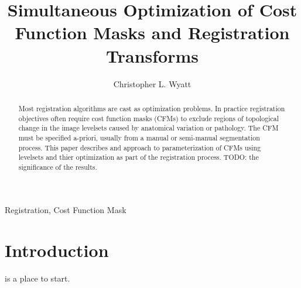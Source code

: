 \documentclass[preprint,review,12pt]{elsarticle}
\begin{document}
\begin{frontmatter}

\title{Simultaneous Optimization of Cost Function Masks and
  Registration Transforms}

\author[CLW]{Christopher L. Wyatt}

\address[CLW]{Bradley Department of Electrical and Computer Engineering, Virginia Tech, Blacksburg, VA, USA}

\begin{abstract}
  Most registration algorithms are cast as optimization problems. In
  practice registration objectives often require cost function masks
  (CFMs) to exclude regions of topological change in the image
  levelsets caused by anatomical variation or pathology. The CFM must
  be specified a-priori, usually from a manual or semi-manual
  segmentation process. This paper describes and approach to
  parameterization of CFMs using levelsets and thier optimization as
  part of the registration process. TODO: the significance of the
  results.
\end{abstract}

\begin{keyword}
Registration, Cost Function Mask
\end{keyword}

\end{frontmatter}

\section{Introduction}
\cite{Crum2003} is a place to start.
\end{document}
